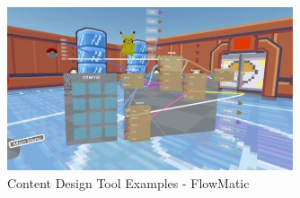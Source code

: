 \begin{figure}[htbp]
    \centering
    \includegraphics[width=0.75\textwidth]{Figures/Background/tools/flowmatic.jpg}
    \caption{Content Design Tool Examples - FlowMatic}
    \label{fig:flowmatic}
\end{figure}